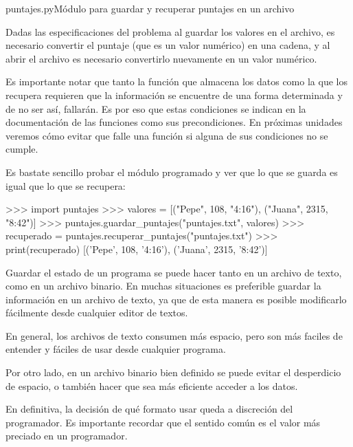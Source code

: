 \begin{codigo}{puntajes.py}{Módulo para guardar y recuperar puntajes en un archivo}
\label{puntajes}

\end{codigo}

Dadas las especificaciones del problema al guardar los valores en el
archivo, es necesario convertir el puntaje (que es un valor numérico) en
una cadena, y al abrir el archivo es necesario convertirlo nuevamente en un
valor numérico.

\begin{observacion}
Es importante notar que tanto la función que almacena los datos como la que
los recupera requieren que la información se encuentre de una forma
determinada y de no ser así, fallarán.  Es por eso que estas condiciones se
indican en la documentación de las funciones como sus precondiciones. En
próximas unidades veremos cómo evitar que falle una función si alguna de
sus condiciones no se cumple.
\end{observacion}

Es bastate sencillo probar el módulo programado y ver que lo que se guarda
es igual que lo que se recupera:

\begin{codigo-python-sn}
>>> import puntajes
>>> valores = [("Pepe", 108, "4:16"), ("Juana", 2315, "8:42")]
>>> puntajes.guardar_puntajes("puntajes.txt", valores)
>>> recuperado = puntajes.recuperar_puntajes("puntajes.txt")
>>> print(recuperado)
[('Pepe', 108, '4:16'), ('Juana', 2315, '8:42')]
\end{codigo-python-sn}


Guardar el estado de un programa se puede hacer tanto en un
archivo de texto, como en un archivo binario. En muchas
situaciones es preferible guardar la información en un archivo de
texto, ya que de esta manera es posible modificarlo fácilmente
desde cualquier editor de textos.

En general, los archivos de texto consumen más
espacio, pero son más faciles de entender y fáciles de usar desde
cualquier programa.

Por otro lado, en un archivo binario bien definido se puede evitar el
desperdicio de espacio, o también hacer que sea más eficiente acceder a los
datos.

En definitiva, la decisión de qué formato usar queda a discreción del
programador. Es importante recordar que el sentido común es el valor más
preciado en un programador.

